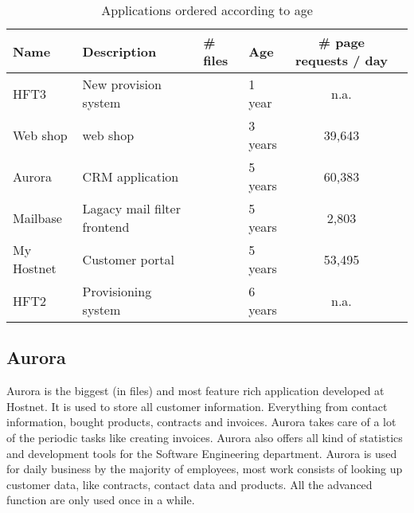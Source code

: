 \begin{table}[b]
	\small
	\centering
	\begin{tabular}{|l|l|l|l|c|r|}
	\hline
	Name & Description & \# files & Age & \# page requests / day\\
	\hline
	HFT3        & New provision system        & \HftThreestrippedFileCount & 1 year  & n.a.    \\
	Web shop    & web shop                    & \OntrackFileCount          & 3 years & 39,643  \\
	Aurora      & CRM application             & \AuroraFileCount           & 5 years & 60,383  \\
	Mailbase    & Lagacy mail filter frontend & \MailbaseFileCount         & 5 years & 2,803   \\
	My Hostnet  & Customer portal             & \MyTwoFileCount            & 5 years & 53,495  \\
	HFT2        & Provisioning system         & \HftTwoFileCount           & 6 years & n.a.    \\
	\hline
	\end{tabular}
	\caption{Applications ordered according to age	\label{tbl:ages}}
\end{table}




\newcommand{\hftTwoFootnote}{HFT2 uses static includes in the legacy part of the application which is not supported. Static included files always report as alive, increasing the percentage of used files significantly. Not all files are included statically so the method is still usable to identify dead code and eliminate it but comparison to the other applications does not make much sense.
}



\subsection*{Aurora}
Aurora is the biggest (in files) and most feature rich application developed at Hostnet. It is used to store all customer information. Everything from contact information, bought products, contracts and invoices. Aurora takes care of a lot of the periodic tasks like creating invoices\cite{boomsma2008}. Aurora also offers all kind of statistics and development tools for the Software Engineering department. Aurora is used for daily business by the majority of employees, most work consists of looking up customer data, like contracts, contact data and products. All the advanced function are only used once in a while.

